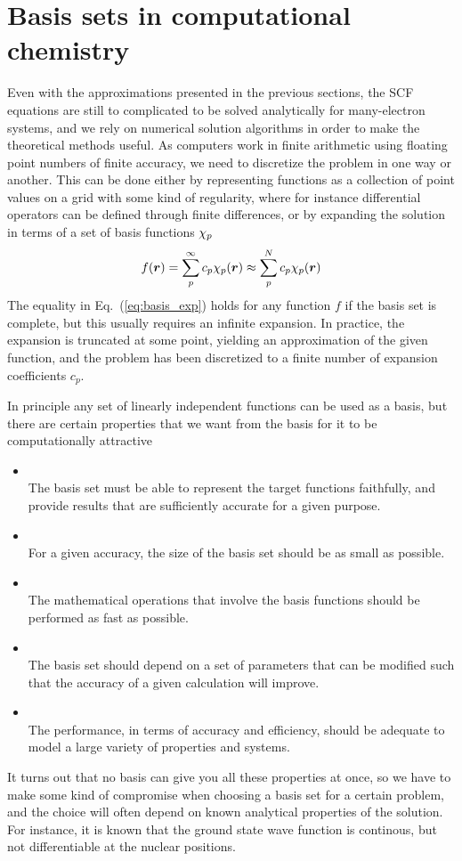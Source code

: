\section{Basis sets in computational chemistry}
Even with the approximations presented in the previous sections, the SCF equations are still
to complicated to be solved analytically for many-electron systems, and we rely on numerical
solution algorithms in order to make the theoretical methods useful. As computers work in finite
arithmetic using floating point numbers of finite accuracy, we need to discretize the problem 
in one way or another. This can be done either by representing functions as a collection of
point values on a grid with some kind of regularity, where for instance differential operators
can be defined through finite differences, or by expanding the solution in terms of a set of 
basis functions $\chi_p$
\begin{equation}
    \label{eq:basis_exp}
    f(\boldsymbol r) = \sum_p^\infty c_p \chi_p(\boldsymbol r) \approx \sum_p^N c_p \chi_p(\boldsymbol r)
\end{equation}
The equality in Eq.~(\ref{eq:basis_exp}) holds for any function $f$ if the basis set is complete,
but this usually requires an infinite expansion. In practice, the expansion is truncated at some 
point, yielding an approximation of the given function, and the problem has been discretized to 
a finite number of expansion coefficients $c_p$. 

In principle any set of linearly independent functions can be used as a basis, but there are
certain properties that we want from the basis for it to be computationally 
attractive\cite{Losilla_thesis:2013}
\begin{itemize}
    \item {}\\
	The basis set must be able to represent the target functions faithfully, and provide
	results that are sufficiently accurate for a given purpose.
    \item {}\\
	For a given accuracy, the size of the basis set should be as small as possible.
    \item {}\\
	The mathematical operations that involve the basis functions should be performed as 
	fast as possible.
    \item {}\\
	The basis set should depend on a set of parameters that can be modified such that the 
	accuracy of a given calculation will improve.
    \item {}\\
	The performance, in terms of accuracy and efficiency, should be adequate to model a large 
	variety of properties and systems.
\end{itemize}
It turns out that no basis can give you all these properties at once, so we have to make some 
kind of compromise when choosing a basis set for a certain problem, and the choice will often 
depend on known analytical properties of the solution. For instance, it is known that the ground
state wave function is continous, but not differentiable at the nuclear 
positions\cite{Kato:1957}.

